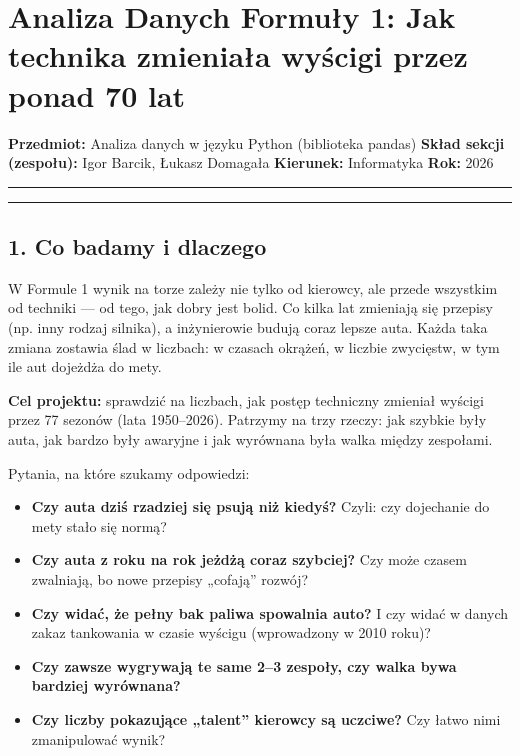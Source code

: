 \documentclass[
]{article}
\author{}
\date{}
\providecommand{\tightlist}{%
\setlength{\itemsep}{0pt}\setlength{\parskip}{0pt}}
\begin{document}
\section{Analiza Danych Formuły 1: Jak technika zmieniała wyścigi przez ponad 70 lat}\label{analiza-danych-formuux142y-1-jak-technika-zmieniaux142a-wyux15bcigi-przez-ponad-70-lat}

\textbf{Przedmiot:} Analiza danych w języku Python (biblioteka pandas)
\textbf{Skład sekcji (zespołu):} Igor Barcik, Łukasz Domagała
\textbf{Kierunek:} Informatyka
\textbf{Rok:} 2026

\begin{center}\rule{0.5\linewidth}{0.5pt}
\end{center}

\tableofcontents

\begin{center}\rule{0.5\linewidth}{0.5pt}
\end{center}

\subsection{1. Co badamy i dlaczego}\label{co-badamy-i-dlaczego}

W Formule 1 wynik na torze zależy nie tylko od kierowcy, ale przede wszystkim od techniki --- od tego,
jak dobry jest bolid. Co kilka lat zmieniają się przepisy (np. inny rodzaj silnika), a inżynierowie
budują coraz lepsze auta. Każda taka zmiana zostawia ślad w liczbach: w czasach okrążeń, w liczbie
zwycięstw, w tym ile aut dojeżdża do mety.

\textbf{Cel projektu:} sprawdzić na liczbach, jak postęp techniczny zmieniał wyścigi przez 77 sezonów
(lata 1950--2026). Patrzymy na trzy rzeczy: jak szybkie były auta, jak bardzo były awaryjne i jak
wyrównana była walka między zespołami.

Pytania, na które szukamy odpowiedzi:

\begin{itemize}
    \tightlist
  \item
    \textbf{Czy auta dziś rzadziej się psują niż kiedyś?} Czyli: czy dojechanie do mety stało się normą?
  \item
    \textbf{Czy auta z roku na rok jeżdżą coraz szybciej?} Czy może czasem zwalniają, bo nowe przepisy
    „cofają'' rozwój?
  \item
    \textbf{Czy widać, że pełny bak paliwa spowalnia auto?} I czy widać w danych zakaz tankowania w czasie
    wyścigu (wprowadzony w 2010 roku)?
  \item
    \textbf{Czy zawsze wygrywają te same 2--3 zespoły, czy walka bywa bardziej wyrównana?}
  \item
    \textbf{Czy liczby pokazujące „talent'' kierowcy są uczciwe?} Czy łatwo nimi zmanipulować wynik?
\end{itemize}
\end{document}
